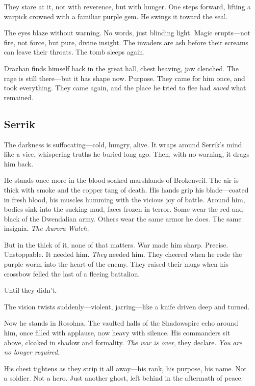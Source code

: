 \documentclass[10pt,a4paper,bg=print,twocolumn,openany,nodeprecatedcode]{dndarticle}
\begin{document}
They stare at it, not with reverence, but with hunger. One steps forward, lifting a warpick crowned with a familiar purple gem. He swings it toward the seal.

The eyes blaze without warning. No words, just blinding light. Magic erupts—not fire, not force, but pure, divine insight. The invaders are ash before their screams can leave their throats. The tomb sleeps again.

Drazhan finds himself back in the great hall, chest heaving, jaw clenched. The rage is still there—but it has shape now. Purpose. They came for him once, and took everything. They came again, and the place he tried to flee had \textit{saved} what remained.

\subsection*{Serrik}

The darkness is suffocating—cold, hungry, alive. It wraps around Serrik’s mind like a vice, whispering truths he buried long ago. Then, with no warning, it drags him back.

He stands once more in the blood-soaked marshlands of Brokenveil. The air is thick with smoke and the copper tang of death. His hands grip his blade—coated in fresh blood, his muscles humming with the vicious joy of battle. Around him, bodies sink into the sucking mud, faces frozen in terror. Some wear the red and black of the Dwendalian army. Others wear the same armor he does. The same insignia. \textit{The Aurora Watch.}

But in the thick of it, none of that matters. War made him sharp. Precise. Unstoppable. It needed him. \textit{They} needed him. They cheered when he rode the purple worm into the heart of the enemy. They raised their mugs when his crossbow felled the last of a fleeing battalion. 

Until they didn’t.

The vision twists suddenly—violent, jarring—like a knife driven deep and turned.

Now he stands in Rosohna. The vaulted halls of the Shadowspire echo around him, once filled with applause, now heavy with silence. His commanders sit above, cloaked in shadow and formality. \textit{The war is over}, they declare. \textit{You are no longer required.}

His chest tightens as they strip it all away—his rank, his purpose, his name. Not a soldier. Not a hero. Just another ghost, left behind in the aftermath of peace. 
\end{document}
